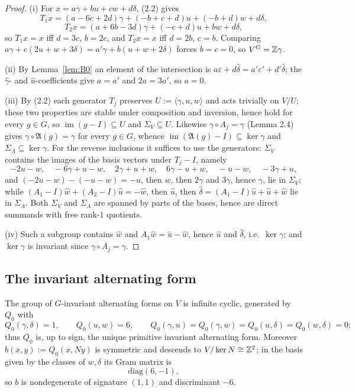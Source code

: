 \begin{proof}
(i) For $x = a\gamma+bu+cw+d\delta$, (2.2) gives
\[
T_1 x = (a-6c+2d)\gamma+(-b+c+d)u+(-b+d)w+d\delta,
\]
\[
T_2 x = (a+6b-3d)\gamma+(-c+d)u+bw+d\delta,
\]
so $T_1x = x$ iff $d=3c$, $b=2c$, and $T_2x = x$ iff $d=2b$, $c=b$. Comparing $a\gamma+c(2u+w+3\delta) = a'\gamma+b(u+w+2\delta)$ forces $b=c=0$, so $V^G = \mathbb{Z}\gamma$.

(ii) By Lemma~\ref{lem:B0} an element of the intersection is $a\varepsilon+d\hat\delta = a'\varepsilon'+d'\hat\delta$; the $\hat\gamma$- and $\hat u$-coefficients give $a=a'$ and $2a=3a'$, so $a=0$.

(iii) By (2.2) each generator $T_j$ preserves $U := \langle \gamma,u,w\rangle$ and acts trivially on $V/U$; these two properties are stable under composition and inversion, hence hold for every $g \in G$, so $\operatorname{im}(g-I) \subseteq U$ and $\Sigma_V \subseteq U$. Likewise $\gamma \circ A_j = \gamma$ (Lemma 2.4) gives $\gamma \circ \mathfrak A(g) = \gamma$ for every $g \in G$, whence $\operatorname{im}(\mathfrak A(g)-I) \subseteq \ker\gamma$ and $\Sigma_\Lambda \subseteq \ker\gamma$. For the reverse inclusions it suffices to use the generators: $\Sigma_V$ contains the images of the basis vectors under $T_j-I$, namely
\[
-2u-w, \quad -6\gamma+u-w, \quad 2\gamma+u+w, \quad 6\gamma-u+w, \quad -u-w, \quad -3\gamma+u,
\]
and $(-2u-w)-(-u-w) = -u$, then $w$, then $2\gamma$ and $3\gamma$, hence $\gamma$, lie in $\Sigma_V$; while $(A_1-I)\hat w+(A_2-I)\hat u = -\hat w$, then $\hat u$, then $\hat\delta = (A_1-I)\hat u+\hat u+\hat w$ lie in $\Sigma_\Lambda$. Both $\Sigma_V$ and $\Sigma_\Lambda$ are spanned by parts of the bases, hence are direct summands with free rank-$1$ quotients.

(iv) Such a subgroup contains $\hat w$ and $A_1\hat w = \hat u-\hat w$, hence $\hat u$ and $\hat\delta$, i.e.\ $\ker\gamma$; and $\ker\gamma$ is invariant since $\gamma \circ A_j = \gamma$.
\end{proof}

\subsection{The invariant alternating form}

\begin{lemma}\label{lem:Q0}
The group of $G$-invariant alternating forms on $V$ is infinite cyclic, generated by $Q_0$ with
\[
Q_0(\gamma,\delta) = 1, \qquad Q_0(u,w) = 6, \qquad Q_0(\gamma,u) = Q_0(\gamma,w) = Q_0(u,\delta) = Q_0(w,\delta) = 0;
\]
thus $Q_0$ is, up to sign, the unique primitive invariant alternating form. Moreover $b(x,y) := Q_0(x,Ny)$ is symmetric and descends to $V/\ker N \cong \mathbb{Z}^2$; in the basis given by the classes of $w,\delta$ its Gram matrix is
\[
\mathrm{diag}(6,-1),
\]
so $b$ is nondegenerate of signature $(1,1)$ and discriminant $-6$.
\end{lemma}


